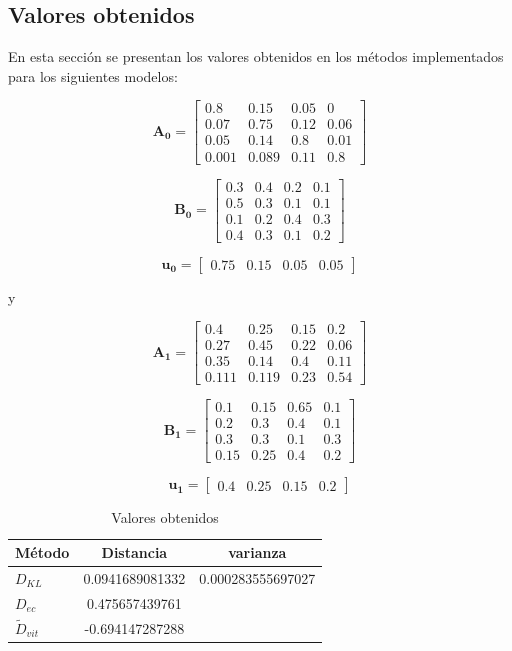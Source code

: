 \documentclass[a4paper]{article}
\begin{document}
\subsection{Valores obtenidos}

En esta sección se presentan los valores obtenidos en los
métodos implementados para los siguientes modelos:

$$
\mathbf{A_0} =
\begin{bmatrix}
  0.8 & 0.15 & 0.05 & 0 \\
  0.07 & 0.75 & 0.12 & 0.06 \\
  0.05 & 0.14 & 0.8 & 0.01 \\
  0.001 & 0.089 & 0.11 & 0.8
\end{bmatrix}
$$

$$
\mathbf{B_0} =
\begin{bmatrix}
  0.3 & 0.4 & 0.2 & 0.1 \\
  0.5 & 0.3 & 0.1 & 0.1 \\
  0.1 & 0.2 & 0.4 & 0.3 \\
  0.4 & 0.3 & 0.1 & 0.2
\end{bmatrix}
$$

$$
\mathbf{u_0} =
\begin{bmatrix}
  0.75 & 0.15 & 0.05 & 0.05
\end{bmatrix}
$$

y

$$
\mathbf{A_1} =
\begin{bmatrix}
  0.4 & 0.25 & 0.15 & 0.2 \\
  0.27 & 0.45 & 0.22 & 0.06 \\
  0.35 & 0.14 & 0.4 & 0.11 \\
  0.111 & 0.119 & 0.23 & 0.54
\end{bmatrix}
$$

$$
\mathbf{B_1} =
\begin{bmatrix}
  0.1 & 0.15 & 0.65 & 0.1 \\
  0.2 & 0.3 & 0.4 & 0.1 \\
  0.3 & 0.3 & 0.1 & 0.3 \\
  0.15 & 0.25 & 0.4 & 0.2
\end{bmatrix}
$$

$$
\mathbf{u_1} =
\begin{bmatrix}
  0.4 & 0.25 & 0.15 & 0.2
\end{bmatrix}
$$

\begin{table}[H]
\centering
\begin{tabular}{l|c|c}
  Método & Distancia & varianza \\\hline
  $D_{KL}$ & 0.0941689081332 & 0.000283555697027\\
  $D_{ec}$ & 0.475657439761 & \\
  $\widetilde{D}_{vit}$ & -0.694147287288 &
\end{tabular}
\caption{\label{tab:widgets}Valores obtenidos}
\end{table}
\end{document}
